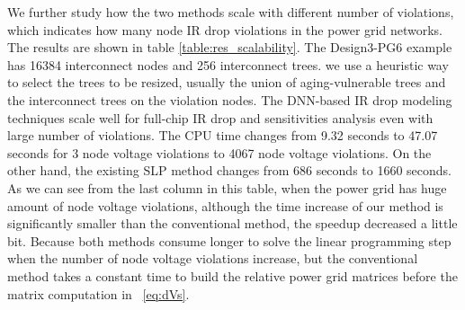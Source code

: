 We further study how the two methods scale with different number of
violations, which indicates how many node IR drop violations
in the power grid networks. The results are shown in table
\ref{table:res_scalability}.
The Design3-PG6 example has 16384 interconnect nodes and 256
interconnect trees. we use a heuristic way to select the trees to be
resized, usually the union of aging-vulnerable trees and the
interconnect trees on the violation nodes. The DNN-based IR drop
modeling techniques scale well for full-chip IR drop and sensitivities
analysis even with large number of violations. The CPU time changes
from 9.32 seconds to 47.07 seconds for 3 node voltage violations to
4067 node voltage violations. On the other hand, the existing SLP
method changes from 686 seconds to 1660 seconds.  As we can see from
the last column in this table, when the power grid has huge amount of
node voltage violations, although the time increase of our method is
significantly smaller than the conventional method, the speedup
decreased a little bit. Because both methods consume longer to solve
the linear programming step when the number of node voltage violations
increase, but the conventional method takes a constant time to
build the relative power grid matrices before the matrix computation
in ~\eqref{eq:dVs}.







